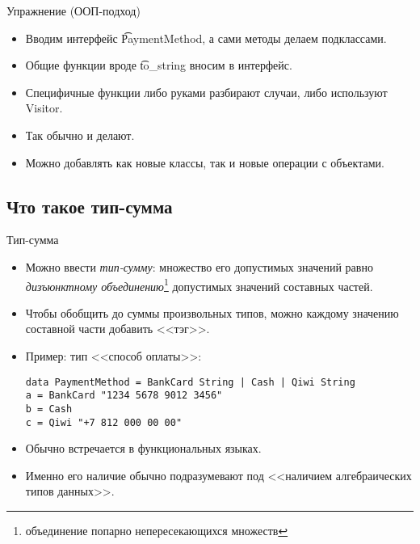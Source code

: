 \begin{frame}{Упражнение (ООП-подход)}
	\begin{itemize}
		\item Вводим интерфейс \t{PaymentMethod}, а сами методы делаем подклассами.
		\item Общие функции вроде \t{to\_string} вносим в интерфейс.
		\item Специфичные функции либо руками разбирают случаи, либо используют Visitor.
		\item Так обычно и делают.
		\item Можно добавлять как новые классы, так и новые операции с объектами.
	\end{itemize}
\end{frame}

\subsection{Что такое тип-сумма}
\begin{frame}[fragile]{Тип-сумма}
	\begin{itemize}
		\item Можно ввести \textit{тип-сумму}: множество его допустимых значений равно \textit{дизъюнктному объединению}\footnote{объединение попарно непересекающихся множеств} допустимых значений составных частей.
		\item Чтобы обобщить до суммы произвольных типов, можно каждому значению составной части добавить <<тэг>>.
		\item Пример: тип <<способ оплаты>>:
\begin{verbatim}
data PaymentMethod = BankCard String | Cash | Qiwi String
a = BankCard "1234 5678 9012 3456"
b = Cash
c = Qiwi "+7 812 000 00 00"
\end{verbatim}
		\item Обычно встречается в функциональных языках.
		\item Именно его наличие обычно подразумевают под <<наличием алгебраических типов данных>>.
	\end{itemize}
\end{frame}

